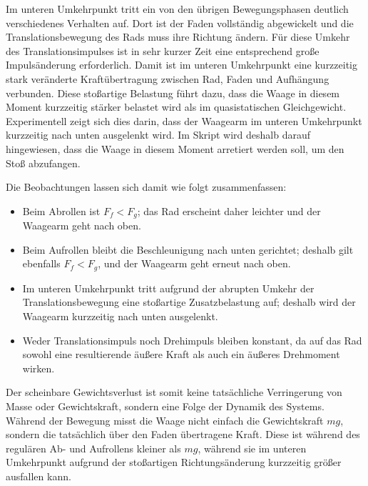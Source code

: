 \documentclass{report}
\begin{document}
\noindent
Im unteren Umkehrpunkt tritt ein von den übrigen Bewegungsphasen deutlich verschiedenes Verhalten auf. Dort ist der Faden vollständig abgewickelt und die Translationsbewegung des Rads muss ihre Richtung ändern. Für diese Umkehr des Translationsimpulses ist in sehr kurzer Zeit eine entsprechend große Impulsänderung erforderlich. Damit ist im unteren Umkehrpunkt eine kurzzeitig stark veränderte Kraftübertragung zwischen Rad, Faden und Aufhängung verbunden. Diese stoßartige Belastung führt dazu, dass die Waage in diesem Moment kurzzeitig stärker belastet wird als im quasistatischen Gleichgewicht. Experimentell zeigt sich dies darin, dass der Waagearm im unteren Umkehrpunkt kurzzeitig nach unten ausgelenkt wird. Im Skript wird deshalb darauf hingewiesen, dass die Waage in diesem Moment arretiert werden soll, um den Stoß abzufangen. 

\noindent
Die Beobachtungen lassen sich damit wie folgt zusammenfassen:
\begin{itemize}
    \item Beim Abrollen ist \(F_f < F_g\); das Rad erscheint daher leichter und der Waagearm geht nach oben.
    \item Beim Aufrollen bleibt die Beschleunigung nach unten gerichtet; deshalb gilt ebenfalls \(F_f < F_g\), und der Waagearm geht erneut nach oben.
    \item Im unteren Umkehrpunkt tritt aufgrund der abrupten Umkehr der Translationsbewegung eine stoßartige Zusatzbelastung auf; deshalb wird der Waagearm kurzzeitig nach unten ausgelenkt.
    \item Weder Translationsimpuls noch Drehimpuls bleiben konstant, da auf das Rad sowohl eine resultierende äußere Kraft als auch ein äußeres Drehmoment wirken.
\end{itemize}

\noindent
Der scheinbare Gewichtsverlust ist somit keine tatsächliche Verringerung von Masse oder Gewichtskraft, sondern eine Folge der Dynamik des Systems. Während der Bewegung misst die Waage nicht einfach die Gewichtskraft \(mg\), sondern die tatsächlich über den Faden übertragene Kraft. Diese ist während des regulären Ab- und Aufrollens kleiner als \(mg\), während sie im unteren Umkehrpunkt aufgrund der stoßartigen Richtungsänderung kurzzeitig größer ausfallen kann.






\newpage
\end{document}
